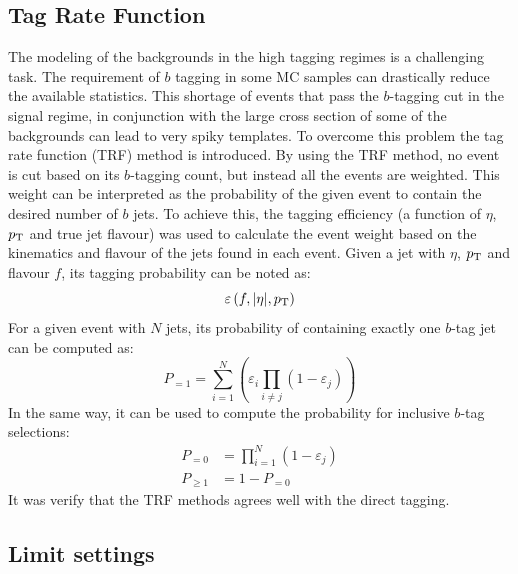 \documentclass{cernrep}
\begin{document}
\subsection{Tag Rate Function}
\label{subsec:trf}
The modeling of the backgrounds in the high tagging regimes is a challenging task. 
The requirement of $b$ tagging in some MC samples can drastically reduce the available statistics.
This shortage of events that pass the $b$-tagging cut in the signal regime, in conjunction with the large cross section of some of the backgrounds can lead to very spiky templates. 
\newline
To overcome this problem the tag rate function (TRF) method is introduced. 
By using the TRF method, no event is cut based on its $b$-tagging count, but instead all the events are weighted.
This weight can be interpreted as the probability of the given event to contain the desired number of $b$ jets. 
To achieve this, the tagging efficiency (a function of $\eta$, $p_{\text{T}}$ and true jet flavour) was
used to calculate the event weight based on the kinematics and flavour of the jets found in each event.
\newline
Given a jet with $\eta$, $p_{\text{T}}$ and flavour $f$, its tagging probability can be noted as:
\begin{equation*}
	\varepsilon \left(f,|\eta|,p_{\text{T}}\right)
\end{equation*}
\newline
For a given event with $N$ jets, its probability of containing exactly one $b$-tag jet can be computed as:
\begin{equation*}
	P_{=1} = \sum\limits_{i=1}^N \left( \varepsilon_{i} \prod\limits_{i \neq j} \left( 1 - \varepsilon_{j} \right) \right)
\end{equation*}
\newline
In the same way, it can be used to compute the probability for inclusive $b$-tag selections:
\begin{align*}
	P_{=0} &= \prod\limits_{i=1}^N \left( 1 - \varepsilon_{j} \right) \\
	P_{\geq 1} &= 1 - P_{=0}
\end{align*}
\newline
It was verify that the TRF methods agrees well with the direct tagging.


\subsection{Limit settings}
\label{subsec:limitsettings}
\end{document}
